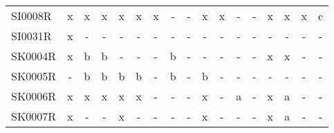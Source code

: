 \begin{table}[H]
{{\begin{tabular}{l|cccccccccccccccc}
        SI0008R &  x &   x &    x &      x &   x &    x &    - &    - &      x &    x &    - &   - &      x &    x &    x &     c \\
        SI0031R &  x &   - &    - &      - &   - &    - &    - &    - &      - &    - &    - &   - &      - &    - &    - &     - \\
        SK0004R &  x &   b &    b &      - &   - &    - &    b &    - &      - &    - &    - &   - &      x &    x &    - &     - \\
        SK0005R &  - &   b &    b &      b &   b &    - &    b &    - &      b &    - &    - &   - &      - &    - &    - &     - \\
        SK0006R &  x &   x &    x &      x &   x &    - &    - &    - &      x &    - &    a &   - &      x &    a &    - &     - \\
        SK0007R &  x &   - &    - &      x &   - &    - &    - &    - &      x &    - &    - &   - &      x &    a &    - &     - \\
\bottomrule
\end{tabular}
 }}
 \end{table}
\vfill

%
%

\cleartoleftpage
